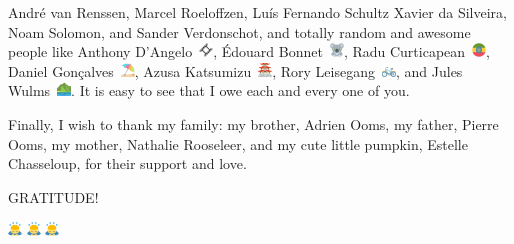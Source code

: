 André van Renssen,
Marcel Roeloffzen,
Luís Fernando Schultz Xavier da Silveira,
Noam Solomon,
and
Sander Verdonschot,
%
and
%
totally random and awesome people like
Anthony D'Angelo~\includegraphics[height=1em]{figures/1f39e},
Édouard Bonnet~\includegraphics[height=1em]{figures/1f428},
Radu Curticapean~\includegraphics[height=1em]{figures/1f1ea-1f1f9},
Daniel Gonçalves~\includegraphics[height=1em]{figures/26f1},
Azusa Katsumizu~\includegraphics[height=1em]{figures/1f3ef},
Rory Leisegang~\includegraphics[height=1em]{figures/1f6b2},
and
Jules Wulms~\includegraphics[height=1em]{figures/26f0}.
It is easy to see that I owe each and every one of you.

Finally, I wish to thank my family:
my brother, Adrien Ooms,
my father, Pierre Ooms,
my mother, Nathalie Rooseleer,
%
and
%
my cute little pumpkin, Estelle Chasseloup,
for their support and love.

\vspace{\fill}
\centerline{\LARGE GRATITUDE!}
\vspace{\fill}
\centerline{\LARGE
\includegraphics[height=1em]{figures/1f647}
\includegraphics[height=1em]{figures/1f647}
\includegraphics[height=1em]{figures/1f647}
}
\vspace{\fill}
